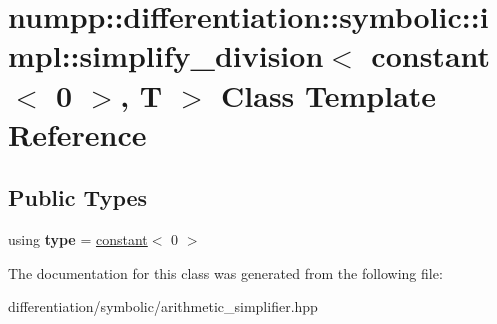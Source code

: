\hypertarget{classnumpp_1_1differentiation_1_1symbolic_1_1impl_1_1simplify__division_3_01constant_3_010_01_4_00_01T_01_4}{}\section{numpp\+:\+:differentiation\+:\+:symbolic\+:\+:impl\+:\+:simplify\+\_\+division$<$ constant$<$ 0 $>$, T $>$ Class Template Reference}
\label{classnumpp_1_1differentiation_1_1symbolic_1_1impl_1_1simplify__division_3_01constant_3_010_01_4_00_01T_01_4}
\subsection*{Public Types}
\begin{DoxyCompactItemize}
\item 
\mbox{\label{classnumpp_1_1differentiation_1_1symbolic_1_1impl_1_1simplify__division_3_01constant_3_010_01_4_00_01T_01_4_a5d3e42dc14d904f332f4172993ac0e61}} 
using {\bfseries type} = \hyperlink{classnumpp_1_1differentiation_1_1symbolic_1_1constant}{constant}$<$ 0 $>$
\end{DoxyCompactItemize}


The documentation for this class was generated from the following file\+:\begin{DoxyCompactItemize}
\item 
differentiation/symbolic/arithmetic\+\_\+simplifier.\+hpp\end{DoxyCompactItemize}
